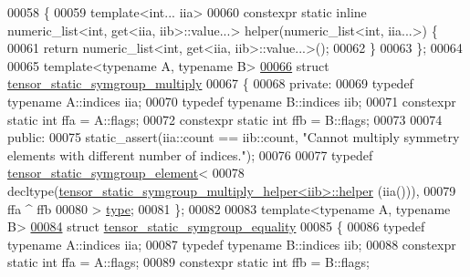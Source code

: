 \begin{DoxyCode}
00058 \{
00059   \textcolor{keyword}{template}<\textcolor{keywordtype}{int}... iia>
00060   constexpr \textcolor{keyword}{static} \textcolor{keyword}{inline} numeric\_list<int, get<iia, iib>::value...> helper(numeric\_list<int, iia...>) \{
00061     \textcolor{keywordflow}{return} numeric\_list<int, get<iia, iib>::value...>();
00062   \}
00063 \};
00064 
00065 \textcolor{keyword}{template}<\textcolor{keyword}{typename} A, \textcolor{keyword}{typename} B>
\hyperlink{struct_eigen_1_1internal_1_1tensor__static__symgroup__multiply}{00066} \textcolor{keyword}{struct }\hyperlink{struct_eigen_1_1internal_1_1tensor__static__symgroup__multiply}{tensor\_static\_symgroup\_multiply}
00067 \{
00068   \textcolor{keyword}{private}:
00069     \textcolor{keyword}{typedef} \textcolor{keyword}{typename} A::indices iia;
00070     \textcolor{keyword}{typedef} \textcolor{keyword}{typename} B::indices iib;
00071     constexpr \textcolor{keyword}{static} \textcolor{keywordtype}{int} ffa = A::flags;
00072     constexpr \textcolor{keyword}{static} \textcolor{keywordtype}{int} ffb = B::flags;
00073   
00074   \textcolor{keyword}{public}:
00075     static\_assert(iia::count == iib::count, \textcolor{stringliteral}{"Cannot multiply symmetry elements with different number of
       indices."});
00076 
00077     \textcolor{keyword}{typedef} \hyperlink{struct_eigen_1_1internal_1_1tensor__static__symgroup__element}{tensor\_static\_symgroup\_element}<
00078       decltype(\hyperlink{struct_eigen_1_1internal_1_1tensor__static__symgroup__multiply__helper}{tensor\_static\_symgroup\_multiply\_helper<iib>::helper}
      (iia())),
00079       ffa ^ ffb
00080     > \hyperlink{struct_eigen_1_1internal_1_1tensor__static__symgroup__element}{type};
00081 \};
00082 
00083 \textcolor{keyword}{template}<\textcolor{keyword}{typename} A, \textcolor{keyword}{typename} B>
\hyperlink{struct_eigen_1_1internal_1_1tensor__static__symgroup__equality}{00084} \textcolor{keyword}{struct }\hyperlink{struct_eigen_1_1internal_1_1tensor__static__symgroup__equality}{tensor\_static\_symgroup\_equality}
00085 \{
00086     \textcolor{keyword}{typedef} \textcolor{keyword}{typename} A::indices iia;
00087     \textcolor{keyword}{typedef} \textcolor{keyword}{typename} B::indices iib;
00088     constexpr \textcolor{keyword}{static} \textcolor{keywordtype}{int} ffa = A::flags;
00089     constexpr \textcolor{keyword}{static} \textcolor{keywordtype}{int} ffb = B::flags;

\end{DoxyCode}
